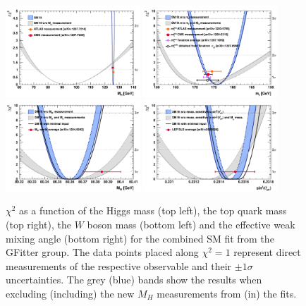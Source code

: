 \begin{figure}[!t]
\centering 
\includegraphics[width=0.45\textwidth]{figs/HiggsScan.pdf}
\includegraphics[width=0.45\textwidth]{figs/TopScan.pdf}
\includegraphics[width=0.45\textwidth]{figs/WMassScan.pdf}
\includegraphics[width=0.45\textwidth]{figs/Sin2ThetaScan.pdf}
\caption{
$\chi^2$ as a function of the Higgs mass (top left), the top quark mass (top
    right), the $W$ boson mass (bottom left) and the effective weak mixing
  angle (bottom right) for the combined SM fit from the GFitter group.  The
  data points placed along $\chi^2=1$ represent direct measurements of the
  respective observable and their $\pm 1\sigma$ uncertainties.  The grey (blue)
  bands show the results when excluding (including) the new $M_H$ measurements
  from (in) the fits. } \label{figure:theory_scans}
\end{figure}


